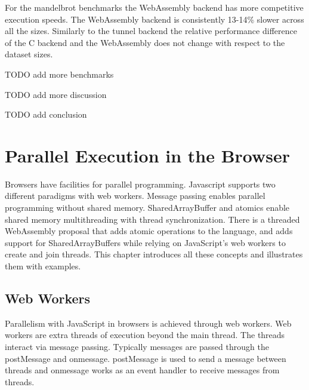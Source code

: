 \documentclass[11pt]{book}
\begin{document}
For the mandelbrot benchmarks the WebAssembly backend has more competitive execution speeds. The WebAssembly backend is consistently 13-14\% slower across all the sizes. Similarly to the tunnel backend the relative performance difference of the C backend and the WebAssembly does not change with respect to the dataset sizes.


{\color{red} TODO} add more benchmarks

{\color{red} TODO} add more discussion

{\color{red} TODO} add conclusion
\chapter{Parallel Execution in the Browser}


Browsers have facilities for parallel programming. Javascript supports two different paradigms with web workers. Message passing enables parallel programming without shared memory. SharedArrayBuffer and atomics enable shared memory multithreading with thread synchronization. There is a threaded WebAssembly proposal that adds atomic operations to the language, and adds support for SharedArrayBuffers while relying on JavaScript's web workers to create and join threads. This chapter introduces all these concepts and illustrates them with examples.




\section{Web Workers}
Parallelism with JavaScript in browsers is achieved through web workers. Web workers are extra threads of execution beyond the main thread. The threads interact via message passing. Typically messages are passed through the postMessage and onmessage. postMessage is used to send a message between threads and onmessage works as an event handler to receive messages from threads. 
\end{document}

